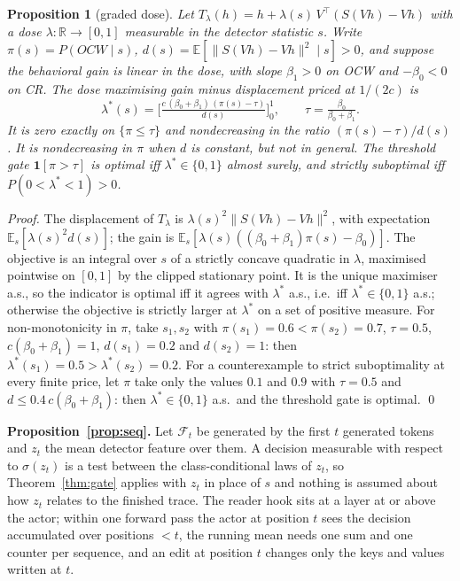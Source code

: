 \documentclass{article}
\newtheorem{proposition}{Proposition}
\newcommand{\ocw}{OCW}
\newcommand{\crok}{CR}
\begin{document}
\begin{proposition}[graded dose]
\label{prop:dose}
Let $T_\lambda(h)=h+\lambda(s)\,V^\top(S(Vh)-Vh)$ with a dose
$\lambda:\mathbb{R}\to[0,1]$ measurable in the detector statistic $s$. Write
$\pi(s)=P(\ocw\mid s)$, $d(s)=\mathbb{E}[\lVert S(Vh)-Vh\rVert^2\mid s]>0$, and
suppose the behavioral gain is linear in the dose, with slope $\beta_1>0$ on
\ocw{} and $-\beta_0<0$ on \crok{}. The dose maximising gain minus
displacement priced at $1/(2c)$ is
\[
\lambda^*(s)=\Big[\tfrac{c\,(\beta_0+\beta_1)\,(\pi(s)-\tau)}{d(s)}\Big]_0^1,\qquad
\tau=\tfrac{\beta_0}{\beta_0+\beta_1}.
\]
It is zero exactly on $\{\pi\le\tau\}$ and nondecreasing in the ratio
$(\pi(s)-\tau)/d(s)$. It is nondecreasing in $\pi$ when $d$ is constant, but
not in general. The threshold gate $\mathbf{1}[\pi>\tau]$ is optimal iff
$\lambda^*\in\{0,1\}$ almost surely, and strictly suboptimal iff
$P(0<\lambda^*<1)>0$.
\end{proposition}

\emph{Proof.} The displacement of $T_\lambda$ is
$\lambda(s)^2\lVert S(Vh)-Vh\rVert^2$, with expectation
$\mathbb{E}_s[\lambda(s)^2d(s)]$; the gain is
$\mathbb{E}_s[\lambda(s)((\beta_0+\beta_1)\pi(s)-\beta_0)]$. The objective is
an integral over $s$ of a strictly concave quadratic in $\lambda$, maximised
pointwise on $[0,1]$ by the clipped stationary point. It is the unique
maximiser a.s., so the indicator is optimal iff it agrees with $\lambda^*$
a.s., i.e.\ iff $\lambda^*\in\{0,1\}$ a.s.; otherwise the objective is strictly
larger at $\lambda^*$ on a set of positive measure. For non-monotonicity in
$\pi$, take $s_1,s_2$ with $\pi(s_1)=0.6<\pi(s_2)=0.7$, $\tau=0.5$,
$c(\beta_0+\beta_1)=1$, $d(s_1)=0.2$ and $d(s_2)=1$: then
$\lambda^*(s_1)=0.5>\lambda^*(s_2)=0.2$. For a counterexample to strict
suboptimality at every finite price, let $\pi$ take only the values $0.1$ and
$0.9$ with $\tau=0.5$ and $d\le0.4\,c(\beta_0+\beta_1)$: then
$\lambda^*\in\{0,1\}$ a.s.\ and the threshold gate is optimal. \qed

\textbf{Proposition~\ref{prop:seq}.} Let $\mathcal{F}_t$ be generated by the first $t$
generated tokens and $z_t$ the mean detector feature over them. A decision
measurable with respect to $\sigma(z_t)$ is a test between the
class-conditional laws of $z_t$, so Theorem~\ref{thm:gate} applies with $z_t$
in place of $s$ and nothing is assumed about how $z_t$ relates to the finished
trace. The reader hook sits at a layer at or above the actor; within one
forward pass the actor at position $t$ sees the decision accumulated over
positions $<t$, the running mean needs one sum and one counter per sequence,
and an edit at position $t$ changes only the keys and values written at $t$.
\end{document}
